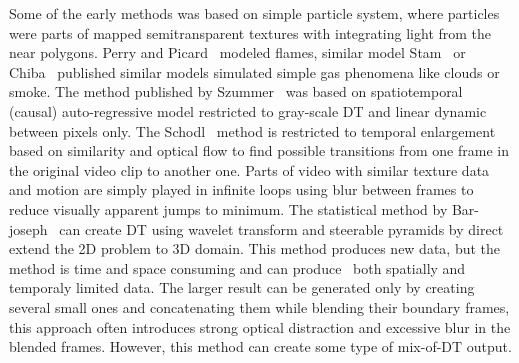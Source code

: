 \documentclass{\adsty/acmsiggraph}
\begin{document}
Some of the early methods was based on simple particle system, where particles were parts of mapped semitransparent textures with integrating light from the near polygons. Perry and Picard~\cite{Perry94synthesizingflames} modeled flames, similar model Stam~\cite{Stam93turbulentgas,chiba94vissimulation} or Chiba~\cite{chiba94vissimulation} published similar models simulated simple gas phenomena like clouds or smoke. The  method published by Szummer~\cite{Szummer96} was based on spatiotemporal (causal) auto-regressive model  restricted to  gray-scale DT and
linear dynamic between pixels only.  
 The Schodl~\cite{Schodl00videotextures} method is restricted to  temporal enlargement based on 
 similarity and optical flow to find   possible transitions from one frame in the original video clip to another one.  Parts of video with similar texture data and motion are simply played in infinite loops using blur between frames to reduce visually apparent jumps to minimum. 
 The statistical method by Bar-joseph~\cite{Bar-joseph01texturemixing,Bar-Joseph99statisticallearning}  can create DT  using  wavelet transform and steerable pyramids by direct extend the 2D problem to 3D domain. This method produces new data, but the method is time and space consuming and can produce~\cite{Bar-joseph01texturemixing} both spatially and temporaly limited data. The larger result can be generated only by creating several small ones and concatenating them while blending their boundary frames, this approach often introduces strong optical distraction and excessive blur in the blended frames.   However, this method  can create some type of mix-of-DT output. 
\end{document}
